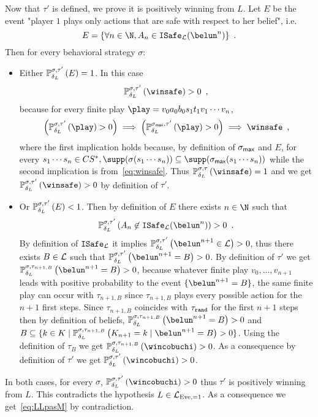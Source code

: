 Now that $\tau'$ is defined, we prove it is positively winning from $L$.
Let $E$ be the event 
{"player $1$ plays only actions that are safe with respect to her belief", i.e.}
\[
E = \{ \forall n\in \N, A_n \in \Isafe_\LL(\belun^n)\}\enspace.
\]
Then for every behavioral strategy $\sigma$:
\begin{itemize}
  \item[\textbullet]
Either $\mathbb{P}^{\sigma,\tau'}_{\delta_L}\left({E}\right)=1$. In this case 
\[
\probimp{\sigma,\tau'}{\delta_L}{\winsafe}> 0\enspace,
\]
because for every {finite play $\play=v_0a_0b_0s_1t_1v_1\cdots v_n$,}
\[
\left(\probimp{\sigma,\tau'}{\delta_L}{\play} > 0\right)
\implies
\left(\probimp{\sigma_{\can},\tau'}{\delta_L}{\play} > 0\right)
\implies
\winsafe\enspace,
\]
where the first implication holds because, by definition of $\sigma_{\textsf{max}}$ and $E$,
for every $s_1\cdots s_n\in CS^*, \supp(\sigma(s_1\cdots s_n))\subseteq \supp(\sigma_{\can}(s_1\cdots s_n))$
while the second implication is from~\eqref{eq:winsafe}.
Thus $\probimp{\sigma,\tau}{\delta_L}{\winsafe}= 1$ and we get
$\probimp{\sigma,\tau'}{\delta_L}{\winsafe} > 0$ by definition of
$\tau'$.
\item[\textbullet]
Or $\mathbb{P}^{\sigma,\tau'}_{\delta_L}\left({E}\right)<1$.
Then by definition of $E$ there exists $n\in\N$
such that 
\[
\probimp{\sigma,\tau'}{\delta_L}{A_n  \not\in
\Isafe_\LL(\belun^n)}>0\enspace.
\]
{
By definition of ${\tt ISafe}_{\mathcal{L}}$ it implies
$\probimp{\sigma,\tau'}{\delta_L}{\belun^{n+1}  \in \LL}>0$,
thus there exists $B\in \mathcal{L}$ such that
$\probimp{\sigma,\tau'}{\delta_L}{\belun^{n+1} =B}>0$.
By definition of $\tau'$ we get
$\probimp{\sigma,\tau_{n+1,B}}{\delta_L}{\belun^{n+1} =B}>0$,
because whatever finite play $v_0,\ldots, v_{n+1}$ leads with positive probability to
the event $\{\belun^{n+1} =B\}$,
the same finite play can occur with 
$\tau_{n+1,B}$ since $\tau_{n+1,B}$ plays every possible action for the $n+1$ first steps.
Since $\tau_{n+1,B}$ coincides with $\tau_{\tt rand}$ for the first $n+1$ steps then
by definition of beliefs,
$\probimp{\sigma,\tau_{n+1,B}}{\delta_L}{\belun^{n+1} =B}>0$
and $B\subseteq \{ k\in K\mid \probimp{\sigma,\tau_{n+1,B}}{\delta_L}{K_{n+1}=k\mid \belun^{n+1} =B}>0\}$.
%
Using the definition of $\tau_B$ we get 
$\probimp{\sigma,\tau_{n+1,B}}{\delta_L}{\wincobuchi}>0$.
}
As a consequence by definition of $\tau'$
we get  $ \probimp{\sigma,\tau'}{\delta_L}{\wincobuchi}
>0 $.
\end{itemize}  
In both cases, for every $\sigma$,
$\probimp{\sigma,\tau'}{\delta_L}{\wincobuchi } >0 $
thus $\tau'$ is positively winning from $L$.
This contradicts the
hypothesis $L\in \mathcal{L}_{\text{Eve},=1}$. As a consequence we get~\eqref{eq:LLpasM} by contradiction.

